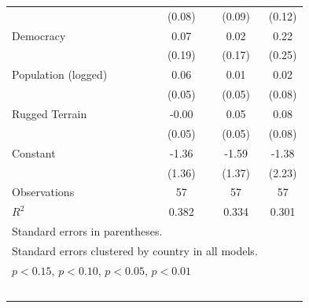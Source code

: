 \documentclass[12pt, letterpaper]{article}
\begin{document}
\begin{table}[htbp]
\begin{small}
\begin{tabular}{l*{3}{c}}
                    &      (0.08)         &      (0.09)         &      (0.12)         \\
Democracy           &        0.07         &        0.02         &        0.22         \\
                    &      (0.19)         &      (0.17)         &      (0.25)         \\
Population (logged) &        0.06         &        0.01         &        0.02         \\
                    &      (0.05)         &      (0.05)         &      (0.08)         \\
Rugged Terrain      &       -0.00         &        0.05         &        0.08         \\
                    &      (0.05)         &      (0.05)         &      (0.08)         \\
Constant            &       -1.36         &       -1.59         &       -1.38         \\
                    &      (1.36)         &      (1.37)         &      (2.23)         \\
\hline
Observations        &          57         &          57         &          57         \\
\(R^{2}\)           &       0.382         &       0.334         &       0.301         \\
\hline\hline
\multicolumn{3}{l}{\footnotesize Standard errors in parentheses.}\\
\multicolumn{3}{l}{\footnotesize Standard errors clustered by country in all models.}\\
\multicolumn{3}{l}{\footnotesize \sym{+} \(p<0.15\), \sym{*} \(p<0.10\), \sym{**} \(p<0.05\), \sym{***} \(p<0.01\)}\\\
\end{tabular}
\end{small}
\end{table}
\end{document}
